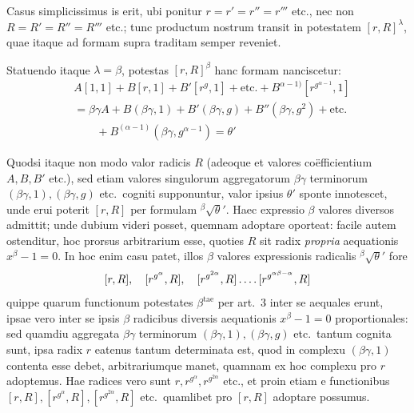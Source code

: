 %
Casus simplicissimus is erit, ubi ponitur $r=r'=r''=r'''$ etc., nec non $R=R'=R''=R'''$ etc.; tunc productum nostrum transit in potestatem $[r,R]^\lambda$, quae itaque ad formam supra traditam semper reveniet.

Statuendo itaque $\lambda=\beta$, potestas $[r,R]^\beta$ hanc formam nanciscetur:
\[
\begin{aligned}
&A[1,1]+B[r,1]+B'[r^g,1]+\text{etc.}+B^{\alpha-1)}[r^{g^{\alpha-1}},1]\\
&{}=\beta\gamma A+B(\beta\gamma,1)+B'(\beta\gamma,g)+B''(\beta\gamma,g^2)+\text{etc.}\\
&\qquad{}+B^{(\alpha-1)}(\beta\gamma,g^{\alpha-1})=\theta'
\end{aligned}
\]

Quodsi itaque non modo valor radicis $R$ (adeoque et valores coëfficientium $A,B,B'$ etc.), sed etiam valores singulorum aggregatorum $\beta\gamma$ terminorum $(\beta\gamma,1),(\beta\gamma,g)$ etc.\ cogniti supponuntur, valor ipsius $\theta'$ sponte innotescet, unde erui poterit $[r,R]$ per formulam ${}^{\beta}\!\surd\theta'$. Haec expressio $\beta$ valores diversos admittit; unde dubium videri posset, quemnam adoptare oporteat: facile autem ostenditur, hoc prorsus arbitrarium esse, quoties $R$ sit radix \emph{propria} aequationis $x^\beta-1=0$. In hoc enim casu patet, illos $\beta$ valores expressionis radicalis ${}^{\beta}\!\surd\theta'$ fore
\[
[r,R],\quad[r^{g^\alpha},R],\quad[r^{g^{2\alpha}},R]\mathinner{.\,.\,.\,.}[r^{g^{\alpha\beta-\alpha}},R]
\]
quippe quarum functionum potestates $\beta^{\mathrm{tae}}$ per art.\ 3 inter se aequales erunt, ipsae vero inter se ipsis $\beta$ radicibus diversis aequationis $x^\beta-1=0$ proportionales: sed quamdiu aggregata $\beta\gamma$ terminorum $(\beta\gamma,1),(\beta\gamma,g)$ etc.\ tantum cognita sunt, ipsa radix $r$ eatenus tantum determinata est, quod in complexu $(\beta\gamma,1)$ contenta esse debet, arbitrariumque manet, quamnam ex hoc complexu pro $r$ adoptemus. Hae radices vero sunt $r,r^{g^\alpha},r^{g^{2\alpha}}$ etc., et proin etiam e functionibus $[r,R],[r^{g^\alpha},R],[r^{g^{2\alpha}},R]$ etc.\ quamlibet pro $[r,R]$ adoptare possumus.

